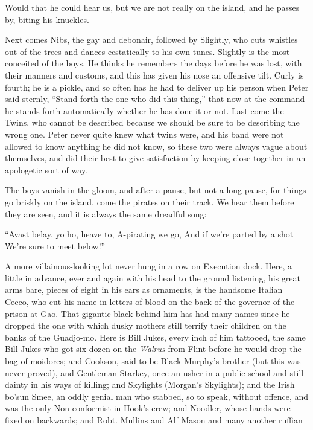 Would that he could hear us, but we are not really on the island, and he passes
by, biting his knuckles.

Next comes Nibs, the gay and debonair, followed by Slightly, who cuts whistles
out of the trees and dances ecstatically to his own tunes.
Slightly is the most conceited of the boys.
He thinks he remembers the days before he was lost, with their manners and
customs, and this has given his nose an offensive tilt.
Curly is fourth; he is a pickle, and so often has he had to deliver up his
person when Peter said sternly, ``Stand forth the one who did this thing,'' that
now at the command he stands forth automatically whether he has done it or not.
Last come the Twins, who cannot be described because we should be sure to be
describing the wrong one.
Peter never quite knew what twins were, and his band were not allowed to know
anything he did not know, so these two were always vague about themselves, and
did their best to give satisfaction by keeping close together in an apologetic
sort of way.

The boys vanish in the gloom, and after a pause, but not a long pause, for
things go briskly on the island, come the pirates on their track.
We hear them before they are seen, and it is always the same dreadful song:

``Avast belay, yo ho, heave to,
    A-pirating we go,
And if we're parted by a shot
    We're sure to meet below!''

A more villainous-looking lot never hung in a row on Execution dock.
Here, a little in advance, ever and again with his head to the ground
listening, his great arms bare, pieces of eight in his ears as
ornaments, is the handsome Italian Cecco, who cut his name in letters
of blood on the back of the governor of the prison at Gao. That
gigantic black behind him has had many names since he dropped the one
with which dusky mothers still terrify their children on the banks of
the Guadjo-mo. Here is Bill Jukes, every inch of him tattooed, the same
Bill Jukes who got six dozen on the \emph{Walrus} from Flint before he would
drop the bag of moidores; and Cookson, said to be Black Murphy's
brother (but this was never proved), and Gentleman Starkey, once an
usher in a public school and still dainty in his ways of killing; and
Skylights (Morgan's Skylights); and the Irish bo'sun Smee, an oddly
genial man who stabbed, so to speak, without offence, and was the only
Non-conformist in Hook's crew; and Noodler, whose hands were fixed on
backwards; and Robt. Mullins and Alf Mason and many another ruffian

